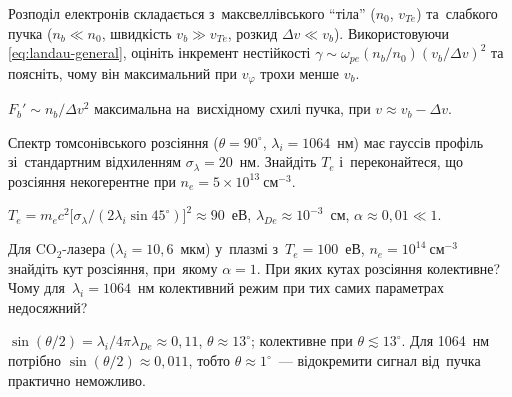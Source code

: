 \begin{problem}\label{prb:BumpOnTail}
Розподіл електронів складається з~максвеллівського \enquote{тіла} ($n_0$, $v_{Te}$) та~слабкого пучка
($n_b\ll n_0$, швидкість $v_b\gg v_{Te}$, розкид $\Delta v\ll v_b$). Використовуючи
\eqref{eq:landau-general}, оцініть інкремент нестійкості $\gamma\sim\omega_{pe}(n_b/n_0)(v_b/\Delta v)^2$ та поясніть, чому
він максимальний при $v_\varphi$ трохи менше $v_b$.
	\begin{solution}
		$F_b'\sim n_b/\Delta v^2$ максимальна на~висхідному схилі пучка, при $v\approx v_b-\Delta v$.
	\end{solution}
\end{problem}

\begin{problem}\label{prb:ThomsonTe}
Спектр томсонівського розсіяння ($\theta=90^\circ$, $\lambda_i=1064$~нм) має гауссів профіль зі~стандартним відхиленням
$\sigma_\lambda=20$~нм. Знайдіть $T_e$ і~переконайтеся, що розсіяння некогерентне при $n_e=5\times10^{13}~\text{см}^{-3}$.
	\begin{solution}
		$T_e=m_ec^2\bigl[\sigma_\lambda/(2\lambda_i\sin45^\circ)\bigr]^2\approx90$~еВ,
$\lambda_{De}\approx10^{-3}$~см, $\alpha\approx0{,}01\ll1$.
	\end{solution}
\end{problem}

\begin{problem}\label{prb:ThomsonCollective}
Для CO$_2$-лазера ($\lambda_i=10{,}6$~мкм) у~плазмі з~$T_e=100$~еВ, $n_e=10^{14}~\text{см}^{-3}$ знайдіть кут розсіяння, при~якому
$\alpha=1$. При яких кутах розсіяння колективне? Чому для~$\lambda_i=1064$~нм колективний режим при тих самих параметрах недосяжний?
	\begin{solution}
		$\sin(\theta/2)=\lambda_i/4\pi\lambda_{De}\approx0{,}11$, $\theta\approx13^\circ$; колективне при $\theta\lesssim13^\circ$.
Для 1064~нм потрібно $\sin(\theta/2)\approx0{,}011$, тобто $\theta\approx1^\circ$~--- відокремити сигнал від~пучка практично неможливо.
	\end{solution}
\end{problem}


